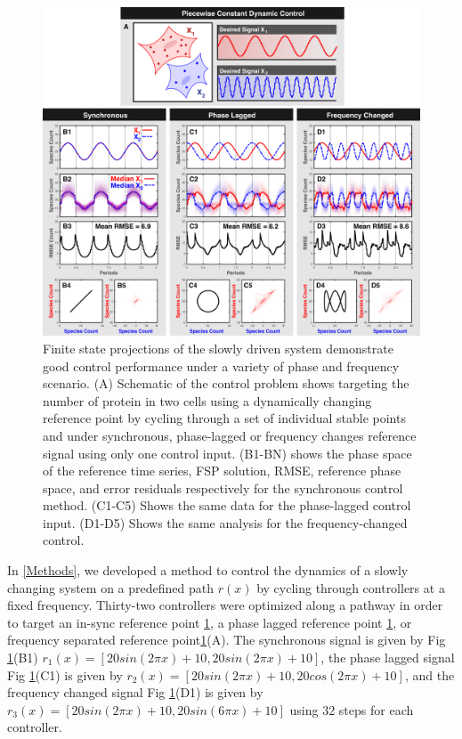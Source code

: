 \documentclass[12pt]{iopart}
\begin{document}
\begin{figure}
\begin{center}
\includegraphics[width=1\textwidth]{DynamicControl.pdf}
\vspace{-0.1in}
\caption{Finite state projections of the slowly driven system demonstrate good control performance under a variety of phase and frequency scenario. (A) Schematic of the control problem shows targeting the number of protein in two cells using a dynamically changing reference point by cycling through a set of individual stable points and under synchronous, phase-lagged or frequency changes reference signal using only one control input. (B1-BN) shows the phase space of the reference time series, FSP solution, RMSE, reference phase space, and error residuals respectively for the synchronous control method. (C1-C5) Shows the same data for the phase-lagged control input. (D1-D5) Shows the same analysis for the frequency-changed control.}
\label{CR}
\end{center}
\vspace{-0.2in}
\end{figure}

In \ref{Methods}, we developed a method to control the dynamics of a slowly changing system on a predefined path $r(x)$ by cycling through controllers at a fixed frequency. Thirty-two controllers were optimized along a pathway in order to target an in-sync reference point \ref{CR}, a phase lagged reference point \ref{CR}, or frequency separated reference point\ref{CR}(A). The synchronous signal is given by Fig \ref{CR}(B1) $r_1(x)=[20 sin(2 \pi x)+10, 20 sin(2 \pi x)+10]$, the phase lagged signal Fig \ref{CR}(C1) is given by $r_2(x)=[20 sin(2 \pi x)+10, 20 cos(2 \pi x)+10]$, and the frequency changed signal Fig \ref{CR}(D1) is given by $r_3(x)=[20 sin(2 \pi x)+10, 20 sin(6 \pi x)+10]$ using 32 steps for each controller. 
\end{document}
